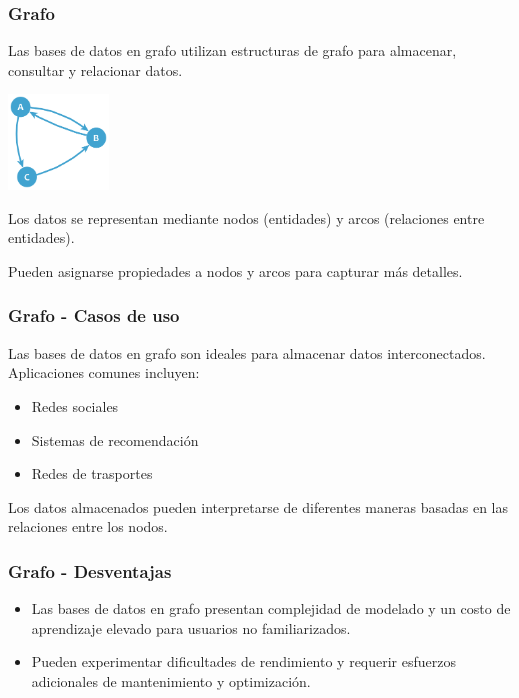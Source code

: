 \begin{frame}
    \frametitle{Grafo}

    Las bases de datos en grafo utilizan estructuras de grafo para almacenar, consultar y relacionar datos. 

    \begin{center}
    \includegraphics[width=0.2\textwidth]{diagramas/Grafo.png}
    \end{center}
    
     
    
    Los datos se representan mediante nodos (entidades) y arcos (relaciones entre entidades).  
    
    Pueden asignarse propiedades a nodos y arcos para capturar más detalles.
\end{frame}

\begin{frame}
    \frametitle{Grafo - Casos de uso}

    Las bases de datos en grafo son ideales para almacenar datos interconectados.  
    Aplicaciones comunes incluyen:
    \begin{itemize}
        \item Redes sociales\\
          
        \item Sistemas de recomendación\\
         
        \item Redes de trasportes\\
        
    \end{itemize}

    Los datos almacenados pueden interpretarse de diferentes maneras basadas en las relaciones entre los nodos.
\end{frame}

\begin{frame}
    \frametitle{Grafo - Desventajas}
    \begin{itemize}
        \item Las bases de datos en grafo presentan complejidad de modelado y un costo de aprendizaje elevado para usuarios no familiarizados.

         

        \item Pueden experimentar dificultades de rendimiento y requerir esfuerzos adicionales de mantenimiento y optimización.
    \end{itemize}
\end{frame}


